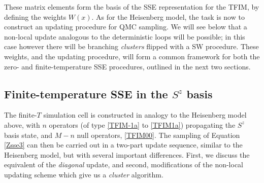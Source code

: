\documentclass[vecphys]{svmult}
\begin{document}
These matrix elements form the basis of the SSE representation for the TFIM, by defining the weights $W(x)$.  As for the Heisenberg model, the task is now to construct an updating procedure for QMC sampling.
We will see below that a non-local update analogous to the deterministic loops will be possible; in this case however there will be branching {\it clusters} flipped with a SW procedure.  These weights, and the updating procedure, will form a common framework for both the zero- and finite-temperature SSE procedures, outlined in the next two sections.  

\subsection{Finite-temperature SSE in the $S^z$ basis} \label{Melko:TFIMfiniteT}

The finite-$T$ simulation cell is constructed in analogy to the Heisenberg model above, with $n$ operators (of type \ref{TFIM-1a} to \ref{TFIM1a}) propagating the $S^z$ basis state, and $M-n$ null operators, \ref{TFIM00}.
The sampling of Equation \ref{Zsse3} can then be carried out in a two-part update sequence, similar to the Heisenberg model, but with several important differences.  First, we discuss the equivalent of the {\em diagonal} update, and second, modifications of the non-local updating scheme which give us a {\em cluster} algorithm.
\end{document}
